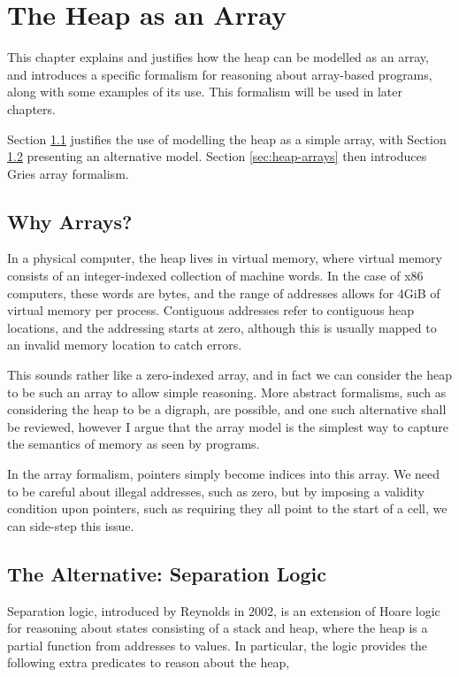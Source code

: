 \chapter{The Heap as an Array}
\label{sec:heap}

This chapter explains and justifies how the heap can be modelled as an
array, and introduces a specific formalism for reasoning about
array-based programs, along with some examples of its use. This
formalism will be used in later chapters.

Section \ref{sec:heap-why} justifies the use of modelling the heap as
a simple array, with Section \ref{sec:heap-separation} presenting an
alternative model. Section \ref{sec:heap-arrays} then introduces Gries
array formalism\cite{Gries87}.

\section{Why Arrays?}
\label{sec:heap-why}

In a physical computer, the heap lives in virtual memory, where
virtual memory consists of an integer-indexed collection of machine
words. In the case of x86 computers, these words are bytes, and the
range of addresses allows for 4GiB of virtual memory per
process. Contiguous addresses refer to contiguous heap locations, and
the addressing starts at zero, although this is usually mapped to an
invalid memory location to catch errors.

This sounds rather like a zero-indexed array, and in fact we can
consider the heap to be such an array to allow simple reasoning. More
abstract formalisms, such as considering the heap to be a digraph, are
possible, and one such alternative shall be reviewed, however I argue
that the array model is the simplest way to capture the semantics of
memory as seen by programs.

In the array formalism, pointers simply become indices into this
array. We need to be careful about illegal addresses, such as zero,
but by imposing a validity condition upon pointers, such as requiring
they all point to the start of a cell, we can side-step this issue.

\section{The Alternative: Separation Logic}
\label{sec:heap-separation}

Separation logic, introduced by Reynolds in 2002\cite{Reynolds02}, is
an extension of Hoare logic for reasoning about states consisting of a
stack and heap, where the heap is a partial function from addresses to
values. In particular, the logic provides the following extra
predicates to reason about the heap,

